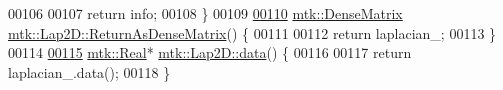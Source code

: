 \begin{DoxyCode}
00106 
00107   \textcolor{keywordflow}{return} info;
00108 \}
00109 
\hypertarget{mtk__lap__2d_8cc_source_l00110}{}\hyperlink{classmtk_1_1Lap2D_af23266b8f7b31b0da7a9480fbaca0cac}{00110} \hyperlink{classmtk_1_1DenseMatrix}{mtk::DenseMatrix} \hyperlink{classmtk_1_1Lap2D_af23266b8f7b31b0da7a9480fbaca0cac}{mtk::Lap2D::ReturnAsDenseMatrix}() \{
00111 
00112   \textcolor{keywordflow}{return} laplacian\_;
00113 \}
00114 
\hypertarget{mtk__lap__2d_8cc_source_l00115}{}\hyperlink{classmtk_1_1Lap2D_a686853fb66c8ed4b05034c151bd22604}{00115} \hyperlink{group__c01-roots_gac080bbbf5cbb5502c9f00405f894857d}{mtk::Real}* \hyperlink{classmtk_1_1Lap2D_a686853fb66c8ed4b05034c151bd22604}{mtk::Lap2D::data}() \{
00116 
00117   \textcolor{keywordflow}{return} laplacian\_.data();
00118 \}
\end{DoxyCode}
